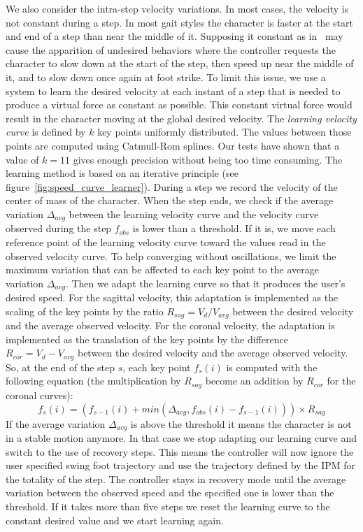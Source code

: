\documentclass[conference]{acmsiggraph}
\begin{document}
We also consider the intra-step velocity variations. In most cases, the velocity is not constant during a step. In most gait styles the character is faster at the start and end of a step than near the middle of it. Supposing it constant as in~\cite{coros2010generalized} may cause the apparition of undesired behaviors where the controller requests the character to slow down at the start of the step, then speed up near the middle of it, and to slow down once again at foot strike. To limit this issue, we use a system to learn the desired velocity at each instant of a step that is needed to produce a virtual force as constant as possible. This constant virtual force would result in the character moving at the global desired velocity. The \textit{learning velocity curve} is defined by $k$ key points uniformly distributed. The values between those points are computed using Catmull-Rom splines. Our tests have shown that a value of $k=11$ gives enough precision without being too time consuming.
The learning method is based on an iterative principle (see figure~\ref{fig:speed_curve_learner}). During a step we record the velocity of the center of mass of the character. When the step ends, we check if the average variation $\Delta_{avg}$ between the learning velocity curve and the velocity curve observed during the step $f_{obs}$ is lower than a threshold. If it is, we move each reference point of the learning velocity curve toward the values read in the observed velocity curve. To help converging without oscillations, we limit the maximum variation that can be affected to each key point to the average variation $\Delta_{avg}$. Then we adapt the learning curve so that it produces the user's desired speed. For the sagittal velocity, this adaptation is implemented as the scaling of the key points by the ratio $R_{sag}=V_d/V_{avg}$ between the desired velocity and the average observed velocity. For the coronal velocity, the adaptation is implemented as the translation of the key points by the difference $R_{cor}=V_d - V_{avg}$ between the desired velocity and the average observed velocity. So, at the end of the step $s$, each key point $f_s(i)$ is computed with the following equation  (the multiplication by $R_{sag}$ become an addition by $R_{cor}$ for the coronal curves):
\begin{equation}
f_s(i)= (f_{s-1}(i) + min(\Delta_{avg},f_{obs}(i)- f_{s-1}(i))) \times R_{sag}
\end{equation}
If the average variation $\Delta_{avg}$ is above the threshold it means the character is not in a stable motion anymore.
In that case we stop adapting our learning curve and switch to the use of recovery steps. This means the controller will now ignore the user specified swing foot trajectory and use the trajectory defined by the IPM for the totality of the step. The controller stays in recovery mode until the average variation between the observed speed and the specified one is lower than the threshold. If it takes more than five steps we reset the learning curve to the constant desired value and we start learning again. 
\end{document}
